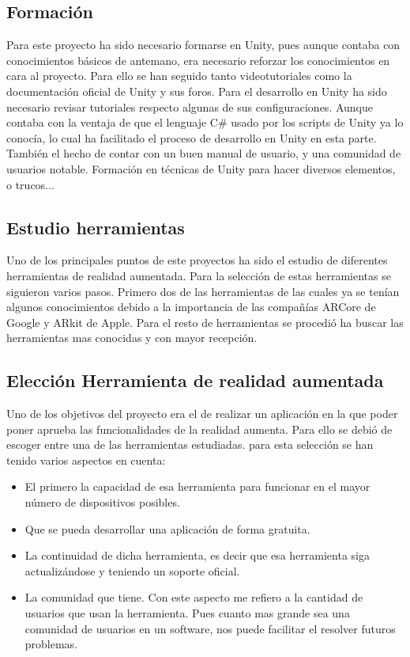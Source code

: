 
\subsection{Formación}
Para este proyecto ha sido necesario formarse en Unity, pues aunque contaba con conocimientos básicos de antemano, era necesario reforzar los conocimientos en cara al proyecto. Para ello se han seguido tanto videotutoriales como la documentación oficial de Unity y sus foros.
Para el desarrollo en Unity ha sido necesario revisar tutoriales respecto algunas de sus configuraciones.
Aunque contaba con la ventaja de que el lenguaje C\# usado por los scripts de Unity ya lo conocía, lo cual ha facilitado el proceso de desarrollo en Unity en esta parte. También el hecho de contar con un buen manual de usuario, y una comunidad de usuarios notable.
Formación en técnicas de Unity para hacer diversos elementos, o trucos...

\subsection{Estudio herramientas}
Uno de los principales puntos de este proyectos ha sido el estudio de diferentes herramientas de realidad aumentada. Para la selección de estas herramientas se siguieron varios pasos. Primero dos de las herramientas de las cuales ya se tenían algunos conocimientos debido a la importancia de las compañías ARCore de Google y ARkit de Apple. Para el resto de herramientas se procedió ha buscar las herramientas mas conocidas y con mayor recepción.

\subsection{Elección Herramienta de realidad aumentada}

Uno de los objetivos del proyecto era el de realizar un aplicación en la que poder poner aprueba las funcionalidades de la realidad aumenta. Para ello se debió de escoger entre una de las herramientas estudiadas. para esta selección se han tenido varios aspectos en cuenta: 
\begin{itemize}
	\item El primero la capacidad de esa herramienta para funcionar en el mayor número de dispositivos posibles.
	\item Que se pueda desarrollar una aplicación de forma gratuita.
	\item La continuidad de dicha herramienta, es decir que esa herramienta siga actualizándose y teniendo un soporte oficial.
	\item La comunidad que tiene. Con este aspecto me refiero a la cantidad de usuarios que usan la herramienta. Pues cuanto mas grande sea una comunidad de usuarios en un software, nos puede facilitar el resolver futuros problemas.
	
\end{itemize}

